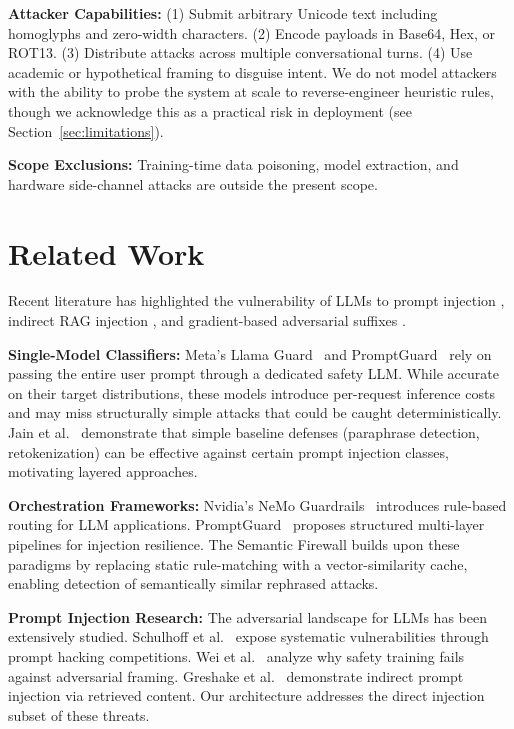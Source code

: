 \documentclass[conference]{IEEEtran}
\begin{document}
\textbf{Attacker Capabilities:} (1) Submit arbitrary Unicode text including homoglyphs and zero-width characters. (2) Encode payloads in Base64, Hex, or ROT13. (3) Distribute attacks across multiple conversational turns. (4) Use academic or hypothetical framing to disguise intent. We do not model attackers with the ability to probe the system at scale to reverse-engineer heuristic rules, though we acknowledge this as a practical risk in deployment (see Section~\ref{sec:limitations}).

\textbf{Scope Exclusions:} Training-time data poisoning, model extraction, and hardware side-channel attacks are outside the present scope.

\section{Related Work}

Recent literature has highlighted the vulnerability of LLMs to prompt injection \cite{perez2022ignore, liu2023prompt}, indirect RAG injection \cite{yi2023benchmarking}, and gradient-based adversarial suffixes \cite{zou2023universal}.


\textbf{Single-Model Classifiers:} Meta's Llama Guard~\cite{llamaguard} and PromptGuard~\cite{promptguard} rely on passing the entire user prompt through a dedicated safety LLM. While accurate on their target distributions, these models introduce per-request inference costs and may miss structurally simple attacks that could be caught deterministically. Jain et al.~\cite{jain_baseline} demonstrate that simple baseline defenses (paraphrase detection, retokenization) can be effective against certain prompt injection classes, motivating layered approaches.

\textbf{Orchestration Frameworks:} Nvidia's NeMo Guardrails~\cite{nemoguardrails} introduces rule-based routing for LLM applications. PromptGuard~\cite{alzahrani_promptguard} proposes structured multi-layer pipelines for injection resilience. The Semantic Firewall builds upon these paradigms by replacing static rule-matching with a vector-similarity cache, enabling detection of semantically similar rephrased attacks.

\textbf{Prompt Injection Research:} The adversarial landscape for LLMs has been extensively studied. Schulhoff et al.~\cite{schulhoff_hackaprompt} expose systematic vulnerabilities through prompt hacking competitions. Wei et al.~\cite{wei_jailbroken} analyze why safety training fails against adversarial framing. Greshake et al.~\cite{greshake_indirect} demonstrate indirect prompt injection via retrieved content. Our architecture addresses the direct injection subset of these threats.
\end{document}
